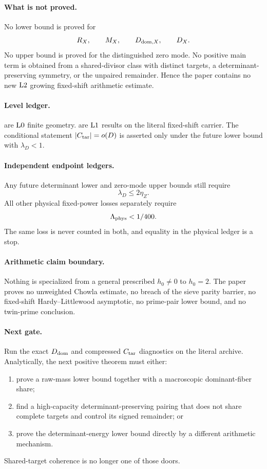 \paragraph{What is not proved.}
No lower bound is proved for
\[
 R_X,\qquad M_X,\qquad D_{\mathrm{dom},X},\qquad D_X.
\]
No upper bound is proved for the distinguished zero mode.  No
positive main term is obtained from a shared-divisor class with
distinct targets, a determinant-preserving symmetry, or the unpaired
remainder.  Hence the paper contains no new \(\mathrm{L2}\) growing
fixed-shift arithmetic estimate.

\paragraph{Level ledger.}
 are
\(\mathrm{L0}\) finite geometry.
are \(\mathrm{L1}\) results on the literal fixed-shift
carrier.  The conditional statement \(|C_{\mathrm{tar}}|=o(D)\) is asserted
only under the future lower bound with \(\lambda_D<1\).

\paragraph{Independent endpoint ledgers.}
Any future determinant lower and zero-mode upper bounds still require
\[
 \lambda_D\le2\eta_Z.
\]
All other physical fixed-power losses separately require
\[
 \Lambda_{\rm phys}<1/400.
\]
The same loss is never counted in both, and equality in the physical
ledger is a stop.

\paragraph{Arithmetic claim boundary.}
Nothing is specialized from a general prescribed \(h_0\ne0\) to
\(h_0=2\).  The paper proves no unweighted Chowla estimate, no breach
of the sieve parity barrier, no fixed-shift Hardy--Littlewood
asymptotic, no prime-pair lower bound, and no twin-prime conclusion.

\paragraph{Next gate.}
Run the exact \(D_{\mathrm{dom}}\) and compressed \(C_{\mathrm{tar}}\) diagnostics on
the literal archive.  Analytically, the next positive theorem must
either:
\begin{enumerate}[label=(\roman*),leftmargin=2.2em]
\item prove a raw-mass lower bound together with a macroscopic
  dominant-fiber share;
\item find a high-capacity determinant-preserving pairing that does
  not share complete targets and control its signed remainder; or
\item prove the determinant-energy lower bound directly by a
  different arithmetic mechanism.
\end{enumerate}
Shared-target coherence is no longer one of those doors.
